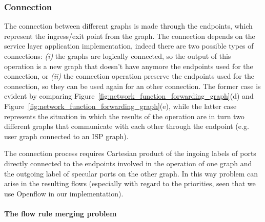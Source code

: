 \subsubsection{Connection}
The connection between different graphs is made through the endpoints, which represent the ingress/exit point from the graph. The connection depends on the service layer application implementation, indeed there are two possible types of connections: \textit{(i)} the graphs are logically connected, so the output of this operation is a new graph that doesn't have anymore the endpoints used for the connection, or \textit{(ii)} the connection operation preserve the endpoints used for the connection, so they can be used again for an other connection. The former case is evident by comparing  Figure~\ref{fig:network_function_forwarding_graph}(d) and Figure~\ref{fig:network_function_forwarding_graph}(e), while the latter case represents the situation in which the results of the operation are in turn two different graphs 
that communicate with each other through the endpoint (e.g. user graph connected to an ISP graph).

%
%
The connection process requires Cartesian product of the ingoing labels of ports directly connected to the endpoints involved in the operation of one graph and the outgoing label of specular ports on the other graph. In this way problem can arise in the resulting flows (especially with regard to the priorities, seen that we use Openflow in our implementation).

\paragraph{The flow rule merging problem}
\label{chap:the_merging_problem}


